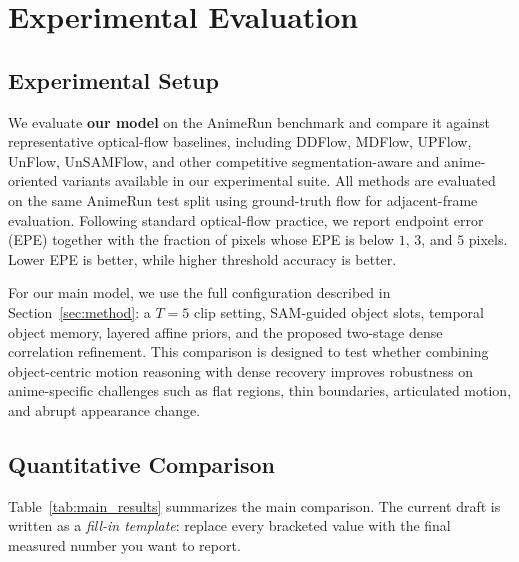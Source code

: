 
\section{Experimental Evaluation}
\label{sec:eval}

\subsection{Experimental Setup}

We evaluate \textbf{our model} on the AnimeRun benchmark and compare it against representative optical-flow baselines, including DDFlow, MDFlow, UPFlow, UnFlow, UnSAMFlow, and other competitive segmentation-aware and anime-oriented variants available in our experimental suite. All methods are evaluated on the same AnimeRun test split using ground-truth flow for adjacent-frame evaluation. Following standard optical-flow practice, we report endpoint error (EPE) together with the fraction of pixels whose EPE is below $1$, $3$, and $5$ pixels. Lower EPE is better, while higher threshold accuracy is better.

For our main model, we use the full configuration described in Section~\ref{sec:method}: a $T{=}5$ clip setting, SAM-guided object slots, temporal object memory, layered affine priors, and the proposed two-stage dense correlation refinement. This comparison is designed to test whether combining object-centric motion reasoning with dense recovery improves robustness on anime-specific challenges such as flat regions, thin boundaries, articulated motion, and abrupt appearance change.

\subsection{Quantitative Comparison}

Table~\ref{tab:main_results} summarizes the main comparison. The current draft is written as a \emph{fill-in template}: replace every bracketed value with the final measured number you want to report.

